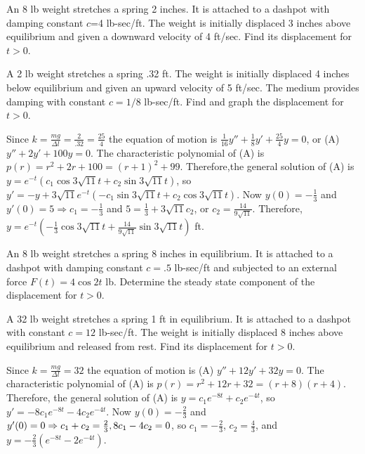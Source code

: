 \documentclass{ximera}
\begin{document}
\begin{problem}\label{exer:6.2.11}
An 8 lb weight stretches a spring 2 inches. It is attached to a
dashpot with damping constant $c$=4 lb-sec/ft. The weight is
initially displaced 3 inches above equilibrium and given a downward
velocity of 4 ft/sec. Find its displacement for $t>0$.
\end{problem}

\begin{problem}\label{exer:6.2.12}  
A 2 lb weight stretches a spring .32 ft. The weight is initially
displaced 4 inches below equilibrium and given an upward velocity of 5
ft/sec. The medium provides damping with constant $c=1/8$ lb-sec/ft.
Find and graph the displacement for $t>0$.

\begin{solution}
    Since $k=\frac{mg}{\Delta l}=\frac{2}{.32}=\frac{25}{4}$ the
equation of motion is
$\frac{1}{16}y''+\frac{1}{8}y'+\frac{25}{4}y=0$, or (A)
$y''+2y'+100y=0$. The characteristic polynomial of (A) is
$p(r)=r^2+2r+100=(r+1)^2+99$. Therefore,the general solution of (A) is
$y=e^{-t}(c_1\cos3\sqrt{11}t+c_2\sin3\sqrt{11}t)$, so
$y'=-y+3\sqrt{11}e^{-t}(-c_1\sin3\sqrt{11}t+c_2\cos3\sqrt{11}t)$. Now
$y(0)=-\frac{1}{3}$ and $y'(0)=5\Rightarrow c_1=-\frac{1}{3}$ and
$5=\frac{1}{3}+3\sqrt{11}c_2$, or $c_2=\frac{14}{9\sqrt{11}}$.
Therefore,$y=e^{-t}\left(-\frac{1}{3}\cos3\sqrt{11} t+
\frac{14}{9\sqrt{11}}\sin3\sqrt{11}t\right)$ ft.
\end{solution}
\end{problem}

\begin{problem}\label{exer:6.2.13}
  An 8 lb weight stretches a spring 8 inches in equilibrium.
It is attached to a dashpot with damping constant $c=.5$ lb-sec/ft
and subjected to an external force  $F(t)=4\cos2t$ lb.
Determine the steady state component of the displacement for $t>0$.
\end{problem}

\begin{problem}\label{exer:6.2.14}
A 32 lb weight stretches a spring 1 ft in equilibrium. It is attached
to a dashpot with constant $c=12$ lb-sec/ft. The weight is initially
displaced 8 inches above equilibrium and released from rest. Find its
displacement for $t>0$.

\begin{solution}
    Since $k=\frac{mg}{\Delta l}=32$ the
equation of motion is
(A) $y''+12y'+32y=0$.
The characteristic polynomial of (A) is
$p(r)=r^2+12r+32=(r+8)(r+4)$. Therefore,
the general solution of (A) is $y=c_1e^{-8t}+c_2e^{-4t}$, so
$y'=-8c_1e^{-8t}-4c_2e^{-4t}$. Now $y(0)=-\frac{2}{3}$ and
$y'(0)=0\Rightarrow c_1+c_2=\frac{2}{3},\-8c_1-4c_2=0$, so
$c_1=-\frac{2}{3}$,  $c_2=\frac{4}{3}$, and
$y=-\frac{2}{3}(e^{-8t}-2e^{-4t})$.
\end{solution}
\end{problem}
\end{document}
